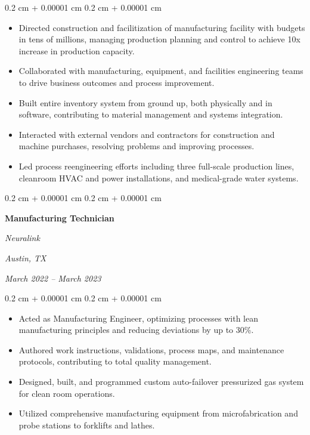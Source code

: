 \documentclass[10pt, letterpaper]{article}
\newenvironment{highlights}{
    \begin{itemize}[
        topsep=0.10 cm,
        parsep=0.10 cm,
        partopsep=0pt,
        itemsep=0pt,
        leftmargin=0.4 cm + 10pt
    ]
}{
    \end{itemize}
} %
\newenvironment{onecolentry}{
    \begin{adjustwidth}{
        0.2 cm + 0.00001 cm
    }{
        0.2 cm + 0.00001 cm
    }
}{
    \end{adjustwidth}
} %
\newenvironment{twocolentry}[2][]{
    \onecolentry
    \def\secondColumn{#2}
    \setcolumnwidth{\fill, 4.5 cm}
    \begin{paracol}{2}
}{
    \switchcolumn \raggedleft \secondColumn
    \end{paracol}
    \endonecolentry
} %
\begin{document}
        \vspace{0.10 cm}
        \begin{onecolentry}
            \begin{highlights}
                \item Directed construction and facilitization of manufacturing facility with budgets in tens of millions, managing production planning and control to achieve 10x increase in production capacity.
                \item Collaborated with manufacturing, equipment, and facilities engineering teams to drive business outcomes and process improvement.
                \item Built entire inventory system from ground up, both physically and in software, contributing to material management and systems integration.
                \item Interacted with external vendors and contractors for construction and machine purchases, resolving problems and improving processes.
                \item Led process reengineering efforts including three full-scale production lines, cleanroom HVAC and power installations, and medical-grade water systems.
            \end{highlights}
        \end{onecolentry}

        \vspace{0.35 cm}

        \begin{twocolentry}{
        \textit{Austin, TX}    
            
        \textit{March 2022 – March 2023}}
            \textbf{Manufacturing Technician}
            
            \textit{Neuralink}
        \end{twocolentry}

        \vspace{0.10 cm}
        \begin{onecolentry}
            \begin{highlights}
                \item Acted as Manufacturing Engineer, optimizing processes with lean manufacturing principles and reducing deviations by up to 30\%.
                \item Authored work instructions, validations, process maps, and maintenance protocols, contributing to total quality management.
                \item Designed, built, and programmed custom auto-failover pressurized gas system for clean room operations.
                \item Utilized comprehensive manufacturing equipment from microfabrication and probe stations to forklifts and lathes.
            \end{highlights}
        \end{onecolentry}
\end{document}
